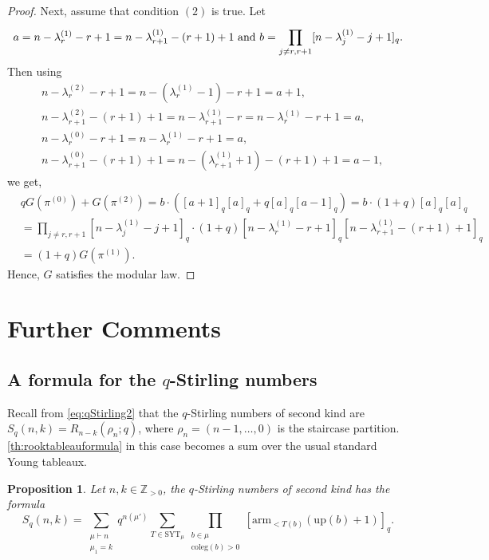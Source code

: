 \documentclass[12pt,reqno]{amsart}
\theoremstyle{plain}
\newtheorem{proposition}[theorem]{Proposition}
\theoremstyle{definition}
\theoremstyle{remark}
\theoremstyle{example}
\numberwithin{equation}{section}
\newcommand\ZZ{\mathbb{Z}}
\newcommand\up{\mathrm{up}}
\newcommand\arm{\mathrm{arm}}
\newcommand{\coleg}{\mathrm{coleg}}
\newcommand{\SYT}{\mathrm{SYT}}
\begin{document}
\begin{proof}
Next, assume that condition $(2)$ is true. Let $$a = n-\lambda^{(1)}_{r}-r+1 = n - \lambda^{(1)}_{r+1} - (r+1)+1 \hbox{ and } b = \prod_{j\neq r,r+1}^{}[n-\lambda^{(1)}_{j}-j+1]_{q}.$$ Then using \begin{align*}
	&n-\lambda^{(2)}_r-r+1 = n-(\lambda^{(1)}_r -1)-r+1 = a+1,
	\\
	& n-\lambda^{(2)}_{r+1}-(r+1)+1 = n-\lambda^{(1)}_{r+1}-r = n - \lambda^{(1)}_r - r +1 = a,
	\\
	& n-\lambda^{(0)}_{r}-r+1 = n-\lambda^{(1)}_{r}-r+1 = a,
	\\
	&n-\lambda^{(0)}_{r+1}-(r+1)+1 = n-(\lambda^{(1)}_{r+1}+1)-(r+1)+1 = a-1,
\end{align*} we get,
\begin{align*}
	&qG(\pi^{(0)})+G(\pi^{(2)}) = b \cdot ([a+1]_{q}[a]_{q}+q[a]_{q}[a-1]_{q}) =b\cdot (1+q)[a]_{q}[a]_{q}
	\\
	&=\prod_{j\neq r,r+1}^{}[n-\lambda^{(1)}_{j}-j+1]_{q}\cdot(1+q)[n-\lambda^{(1)}_{r}-r+1]_{q}[n-\lambda^{(1)}_{r+1}-(r+1)+1]_{q}
	\\
	&= (1+q) G(\pi^{(1)}).
\end{align*}
Hence, $G$ satisfies the modular law.


\end{proof}

\section{Further Comments}

\subsection{A formula for the $q$-Stirling numbers}

Recall from \eqref{eq:qStirling2} that the $q$-Stirling numbers of second kind are $S_q(n,k) = R_{n-k}(\rho_n;q)$, where $\rho_n = (n-1,\ldots,0)$ is the staircase partition. \autoref{th:rooktableauformula} in this case becomes a sum over the usual standard Young tableaux.

\begin{proposition}
	Let $n,k \in \ZZ_{>0}$, the $q$-Stirling numbers of second kind has the formula $$S_q(n,k) = \sum_{\substack{\mu \vdash n \\ \mu_1 = k}} q^{n(\mu')} \sum_{T \in \SYT_\mu} \prod_{\substack{b \in \mu \\ \coleg(b)>0}} [\arm_{<T(b)}(\up(b)+1)]_q.$$ 
\end{proposition}
\end{document}
